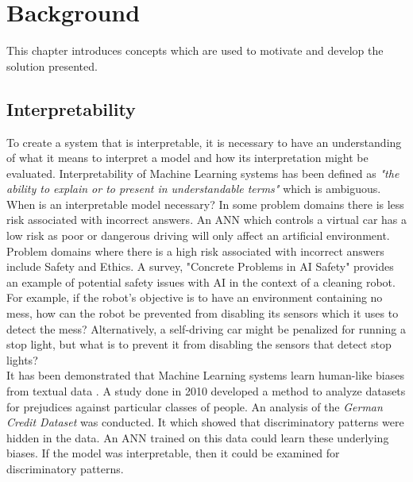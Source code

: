 \chapter{Background}\label{C:backgroundsurvey}
This chapter introduces concepts which are used to motivate and develop the solution presented.

\section{Interpretability}
To create a system that is interpretable, it is necessary to have an understanding of what it means to interpret a model and how its interpretation might be evaluated. Interpretability of Machine Learning systems has been defined as \textit{"the ability to explain or to present in understandable terms"} \cite{doshi2017towards} which is ambiguous.\\

When is an interpretable model necessary? \cite{doshi2017towards} In some problem domains there is less risk associated with incorrect answers. An ANN which controls a virtual car has a low risk as poor or dangerous driving will only affect an artificial environment. Problem domains where there is a high risk associated with incorrect answers include Safety and Ethics. A survey, "Concrete Problems in AI Safety" \cite{amodei2016concrete} provides an example of potential safety issues with AI in the context of a cleaning robot.  For example, if the robot's objective is to have an environment containing no mess, how can the robot be prevented from disabling its sensors which it uses to detect the mess? Alternatively, a self-driving car might be penalized for running a stop light, but what is to prevent it from disabling the sensors that detect stop lights?\\

It has been demonstrated that Machine Learning systems learn human-like biases from textual data \cite{caliskan2017semantics}. A study done in 2010 \cite{ruggieri2010data} developed a method to analyze datasets for prejudices against particular classes of people. An analysis of the \textit{German Credit Dataset} was conducted. It which showed that discriminatory patterns were hidden in the data. An ANN trained on this data could learn these underlying biases. If the model was interpretable, then it could be examined for discriminatory patterns.\\

